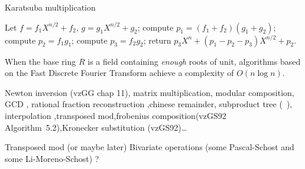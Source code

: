 \begin{algorithm}
  \caption{Karatsuba multiplication}
  \begin{algorithmic}
    \STATE Let $f = f_1X^{n/2} + f_2$, $g = g_1X^{n/2} + g_2$;
    \STATE compute $p_1 = (f_1 + f_2)(g_1 + g_2)$;
    \STATE compute $p_2 = f_1g_1$;
    \STATE compute $p_3 = f_2g_2$;
    \STATE return $p_3X^n + (p_1-p_2-p_3)X^{n/2} + p_2$.
  \end{algorithmic}
\end{algorithm}

When the base ring $R$ is a field containing \emph{enough} roots of
unit, algorithms based on the Fast Discrete Fourier Transform achieve
a complexity of $O(n\log n)$.


Newton inversion (vzGG chap
11), matrix multiplication, modular composition, GCD
\cite[$\S$11.1]{vzGG}, rational fraction reconstruction
\cite[$\S$5.8]{vzGG} ,chinese remainder, subproduct tree
(~\cite[Algorithm~10.3]{vzGG}), interpolation
\cite[$\S$10.2]{vzGG},transposed mod,frobenius composition(vzGS92
Algorithm~5.2),Kronecker substitution (vzGS92)\ldots

Transposed mod (or maybe later)
Bivariate operations (some Pascal-Schost and some Li-Moreno-Schost) ?


